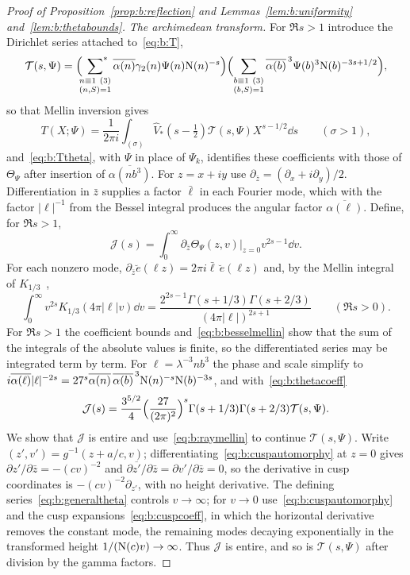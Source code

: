 \begin{proof}[Proof of Proposition~\ref{prop:b:reflection} and Lemmas~\ref{lem:b:uniformity} and~\ref{lem:b:thetabounds}]
\emph{The archimedean transform.} For $\Re s>1$ introduce the Dirichlet series attached to~\eqref{eq:b:T},
\[
  \mathcal T(s,\Psi)=\Bigl(\sfstar_{\substack{n\equiv1\ (3)\\(n,S)=1}}\overline{\alpha(n)}\gamma_2(n)\Psi(n)\NK(n)^{-s}\Bigr)\Bigl(\sum_{\substack{b\equiv1\ (3)\\(b,S)=1}}\overline{\alpha(b)}^{\,3}\Psi(b)^3\NK(b)^{-3s+1/2}\Bigr),
\]
so that Mellin inversion gives
\begin{equation}\label{eq:b:thetamellininversion}
  T(X;\Psi)=\frac1{2\pi i}\int_{(\sigma)}\widehat V_*(s-\tfrac12)\mathcal T(s,\Psi)X^{s-1/2}\dd s\qquad(\sigma>1),
\end{equation}
and~\eqref{eq:b:Ttheta}, with $\Psi$ in place of $\Psi_k$, identifies these coefficients with those of $\Theta_\Psi$ after insertion of $\overline{\alpha(nb^3)}$. For $z=x+iy$ use $\partial_{\bar z}=(\partial_x+i\partial_y)/2$. Differentiation in $\bar z$ supplies a factor $\bar\ell$ in each Fourier mode, which with the factor $|\ell|^{-1}$ from the Bessel integral produces the angular factor $\overline{\alpha(\ell)}$. Define, for $\Re s>1$,
\[
  \mathcal J(s)=\int_0^\infty\partial_{\bar z}\Theta_\Psi(z,v)\Big|_{z=0}v^{2s-1}\dd v.
\]
For each nonzero mode, $\partial_{\bar z}\breve e(\ell z)=2\pi i\bar\ell\,\breve e(\ell z)$ and, by the Mellin integral of $K_{1/3}$~\cite[(10.43.19)]{DLMF},
\begin{equation}\label{eq:b:besselmellin}
  \int_0^\infty v^{2s}K_{1/3}(4\pi|\ell|v)\dd v=\frac{2^{2s-1}\Gamma(s+1/3)\Gamma(s+2/3)}{(4\pi|\ell|)^{2s+1}}\qquad(\Re s>0).
\end{equation}
For $\Re s>1$ the coefficient bounds and~\eqref{eq:b:besselmellin} show that the sum of the integrals of the absolute values is finite, so the differentiated series may be integrated term by term. For $\ell=\lambda^{-3}nb^3$ the phase and scale simplify to $i\overline{\alpha(\ell)}|\ell|^{-2s}=27^s\overline{\alpha(n)}\,\overline{\alpha(b)}^{\,3}\mathrm{N}(n)^{-s}\mathrm{N}(b)^{-3s}$, and with~\eqref{eq:b:thetacoeff}
\begin{equation}\label{eq:b:raymellin}
  \mathcal J(s)=\frac{3^{5/2}}4\Bigl(\frac{27}{(2\pi)^2}\Bigr)^s\Gamma(s+1/3)\Gamma(s+2/3)\mathcal T(s,\Psi).
\end{equation}
We show that $\mathcal J$ is entire and use~\eqref{eq:b:raymellin} to continue $\mathcal T(s,\Psi)$. Write $(z',v')=g^{-1}(z+a/c,v)$; differentiating~\eqref{eq:b:cuspautomorphy} at $z=0$ gives $\partial z'/\partial\bar z=-(cv)^{-2}$ and $\partial\overline{z'}/\partial\bar z=\partial v'/\partial\bar z=0$, so the derivative in cusp coordinates is $-(cv)^{-2}\partial_{z'}$, with no height derivative. The defining series~\eqref{eq:b:generaltheta} controls $v\to\infty$; for $v\to0$ use~\eqref{eq:b:cuspautomorphy} and the cusp expansions~\eqref{eq:b:cuspcoeff}, in which the horizontal derivative removes the constant mode, the remaining modes decaying exponentially in the transformed height $1/(\mathrm{N}(c)v)\to\infty$. Thus $\mathcal J$ is entire, and so is $\mathcal T(s,\Psi)$ after division by the gamma factors.


\end{proof}

